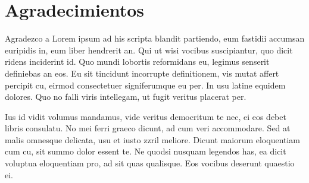 \chapter*{Agradecimientos}
\def\baselinestretch{1.0}

Agradezco a Lorem ipsum ad his scripta blandit partiendo, eum fastidii accumsan euripidis in, eum liber hendrerit an. Qui ut wisi vocibus suscipiantur, quo dicit ridens inciderint id. Quo mundi lobortis reformidans eu, legimus senserit definiebas an eos. Eu sit tincidunt incorrupte definitionem, vis mutat affert percipit cu, eirmod consectetuer signiferumque eu per. In usu latine equidem dolores. Quo no falli viris intellegam, ut fugit veritus placerat per.

Ius id vidit volumus mandamus, vide veritus democritum te nec, ei eos debet libris consulatu. No mei ferri graeco dicunt, ad cum veri accommodare. Sed at malis omnesque delicata, usu et iusto zzril meliore. Dicunt maiorum eloquentiam cum cu, sit summo dolor essent te. Ne quodsi nusquam legendos has, ea dicit voluptua eloquentiam pro, ad sit quas qualisque. Eos vocibus deserunt quaestio ei. 

